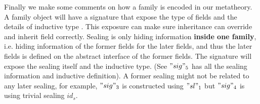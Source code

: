 Finally we make some comments on how a family is encoded in our metatheory. A family object will have a signature that expose the type of fields and the details of inductive type . This exposure can make sure inheritance can override and inherit field correctly. Sealing is only hiding information \textbf{inside one family}, i.e. hiding information of the former fields for the later fields, and thus the later fields is defined on the abstract interface of the former fields. The signature will expose the sealing itself and the inductive type. (See $"sig"_5$ has all the sealing information and inductive definition). A former sealing might not be related to any later sealing, for example, $"sig"_3$ is constructed using $"sl"_1$ but $"sig"_4$ is using trivial sealing $id_s$.